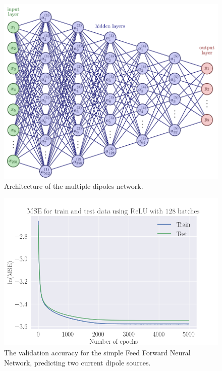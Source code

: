 \documentclass[a4paper, UKenglish, 11pt]{uiomaster}
\begin{document}
\begin{figure}[!htb]
\centering
\includegraphics[width=\linewidth]{figures/NN_multiple_dipoles_architecture.pdf}
\caption{Architecture of the multiple dipoles network.}
\label{fig:NN_multiple_dipoles_architecture}
\end{figure}



\begin{figure}[!htb]
    \centering
    \includegraphics[width=\linewidth]{figures/MSE_26june_two_dipoles_w_amplitude_5000_SGD_lr0.001_wd0.1_mom0.35_bs128_10noise_ReLU_128_5000_N_dipoles_2.png}
    \caption{The validation accuracy for the simple Feed Forward Neural Network, predicting two current dipole sources.}
    \label{fig:dipole_area_result}
\end{figure}
\end{document}
